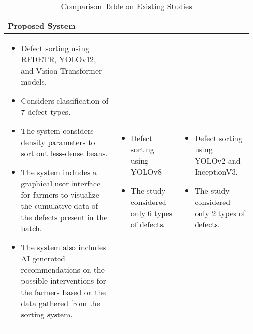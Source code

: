 \begin{center}
	\scriptsize{
    \begin{longtable}{| p{} | p{} | p{} |}
	\caption{Comparison Table on Existing Studies} 	
	\label{comparison_table_existing_studies}
	\endfirsthead
	\endhead
    \hline
    Proposed System & \cite{Balay_Cabrera_Jensen_Mayuga_2024} & \cite{Lualhati_Mariano_Torres_Fenol_2022}\\ \hline
    
	\begin{itemize}
		\item Defect sorting using RFDETR, YOLOv12, and Vision Transformer models. 

		\item Considers classification of 7 defect types. 
	
		\item The system considers density parameters to sort out less-dense beans. 
	
		\item The system includes a graphical user interface for farmers to visualize the cumulative data of the defects present in the batch. 
	
		\item The system also includes AI-generated recommendations on the possible interventions for the farmers based on the data gathered from the sorting system.  
	\end{itemize}
	&
	\begin{itemize}
		\item Defect sorting using YOLOv8 

		\item The study considered only 6 types of defects. 
	\end{itemize}
	&
	\begin{itemize}
		\item Defect sorting using YOLOv2 and InceptionV3. 
		\item The study considered only 2 types of defects. 
	\end{itemize}
	\\
	\hline
    \end{longtable}
	}
\end{center}

